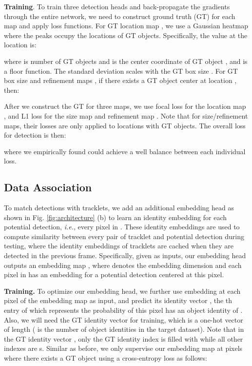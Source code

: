\documentclass[letterpaper, 10 pt, conference]{ieeeconf}
\begin{document}
\vspace{1mm}\noindent\textbf{Training}. To train three detection heads and back-propagate the gradients through the entire network, we need to construct ground truth (GT) for each map and apply loss functions. For GT location map , we use a Gaussian heatmap where the peaks occupy the locations of GT objects.
Specifically, the value at the location  is: 
\vspace{-0.1cm}

where  is number of GT objects and  is the center coordinate of GT object , and  is a floor function. The standard deviation  scales with the GT box size  \cite{Law2018}. For GT box size and refinement maps , if there exists a GT object center at location , then:
\vspace{-0.1cm}



After we construct the GT for three maps, we use focal loss for the location map , and L1 loss for the size map  and refinement map . Note that for size/refinement maps, their losses are only applied to locations with GT objects. The overall loss for detection is then:
\vspace{-0.1cm}

where we empirically found  could achieve a well balance between each individual loss.

\subsection{Data Association \label{sec:asso}}

To match detections with tracklets, we add an additional embedding head as shown in Fig. \ref{fig:architecture} (b) to learn an identity embedding for each potential detection, \emph{i.e.}, every pixel in . These identity embeddings are used to compute similarity between every pair of tracklet and potential detection during testing, where the identity embeddings of tracklets are cached when they are detected in the previous frame. Specifically, given  as inputs, our embedding head outputs an embedding map , where  denotes the embedding dimension and each pixel in  has an embedding for a potential detection centered at this pixel.

\vspace{1mm}\noindent\textbf{Training.} To optimize our embedding head, we further use embedding at each pixel of the embedding map  as input, and predict its identity vector , the th entry of which represents the probability of this pixel has an object identity of . Also, we will need the GT identity vector  for training, which is a one-hot vector of length  ( is the number of object identities in the target dataset). Note that in the GT identity vector , only the GT identity index is filled with  while all other indexes are s. Similar as before, we only supervise our embedding map  at pixels where there exists a GT object using a cross-entropy loss as follows:
\vspace{-0.1cm}
\end{document}
